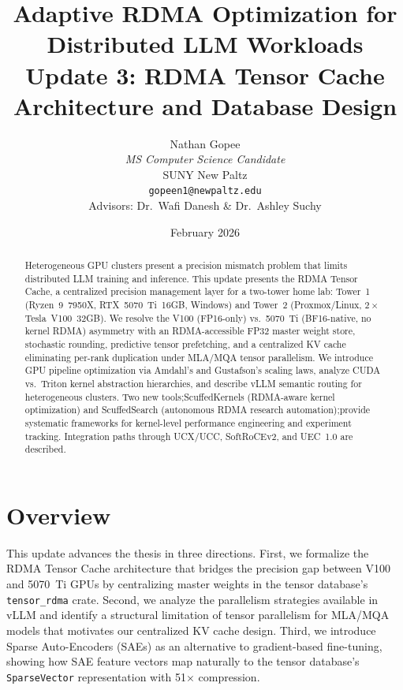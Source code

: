 \documentclass[11pt,letterpaper]{article}
\title{
    \vspace{-1cm}
    \textbf{Adaptive RDMA Optimization for Distributed LLM Workloads} \\[0.5em]
    \large Update 3: RDMA Tensor Cache Architecture and Database Design
}
\author{
    Nathan Gopee \\
    \textit{MS Computer Science Candidate} \\
    SUNY New Paltz \\
    \texttt{gopeen1@newpaltz.edu} \\[1em]
    \small Advisors: Dr.\ Wafi Danesh \& Dr.\ Ashley Suchy
}
\date{February 2026}
\theoremstyle{definition}
\begin{document}
\maketitle

\begin{abstract}
\noindent
Heterogeneous GPU clusters present a precision mismatch problem that limits distributed LLM training and inference. This update presents the RDMA Tensor Cache, a centralized precision management layer for a two-tower home lab: Tower~1 (Ryzen~9~7950X, RTX~5070~Ti~16GB, Windows) and Tower~2 (Proxmox/Linux, $2\times$ Tesla~V100~32GB). We resolve the V100 (FP16-only) vs.\ 5070~Ti (BF16-native, no kernel RDMA) asymmetry with an RDMA-accessible FP32 master weight store, stochastic rounding, predictive tensor prefetching, and a centralized KV cache eliminating per-rank duplication under MLA/MQA tensor parallelism. We introduce GPU pipeline optimization via Amdahl's and Gustafson's scaling laws, analyze CUDA vs.\ Triton kernel abstraction hierarchies, and describe vLLM semantic routing for heterogeneous clusters. Two new tools;ScuffedKernels (RDMA-aware kernel optimization) and ScuffedSearch (autonomous RDMA research automation);provide systematic frameworks for kernel-level performance engineering and experiment tracking. Integration paths through UCX/UCC, SoftRoCEv2, and UEC~1.0 are described.
\end{abstract}

\tableofcontents
\newpage

\section{Overview}
\label{sec:overview}

This update advances the thesis in three directions. First, we formalize the RDMA Tensor Cache architecture that bridges the precision gap between V100 and 5070~Ti GPUs by centralizing master weights in the tensor database's \texttt{tensor\_rdma} crate. Second, we analyze the parallelism strategies available in vLLM and identify a structural limitation of tensor parallelism for MLA/MQA models that motivates our centralized KV cache design. Third, we introduce Sparse Auto-Encoders (SAEs) as an alternative to gradient-based fine-tuning, showing how SAE feature vectors map naturally to the tensor database's \texttt{SparseVector} representation with 51$\times$ compression.
\end{document}
